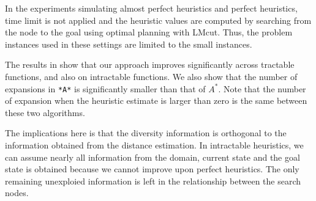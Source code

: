 In the experiments simulating almost perfect heuristics and perfect
heuristics, time limit is not applied and the heuristic values are computed by searching
from the node to the goal using optimal planning with LMcut. Thus, the
problem instances used in these settings are limited to the small instances.


The results in  show that our approach improves significantly across tractable functions, and also on intractable functions. We also show that the number of expansions in \verb~*A*~ is significantly smaller than that of $A^*$. Note that the number of expansion when the heuristic estimate is larger than zero is the same between these two algorithms.

The implications here is that the diversity information is orthogonal to the information obtained from the distance estimation. In intractable heuristics, we can assume nearly all information from the domain, current state and the goal state is obtained because we cannot improve upon perfect heuristics. The only remaining unexploied information is left in the relationship between the search nodes.
